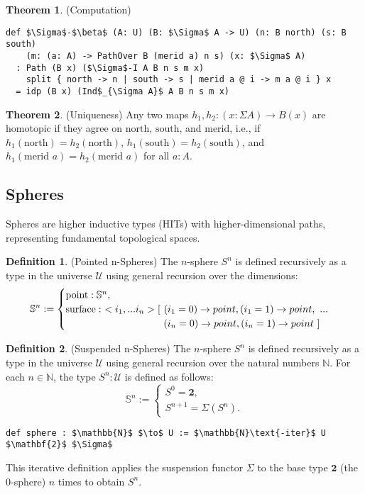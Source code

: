 \documentclass{article}
\theoremstyle{definition}
\newtheorem{theorem}{Theorem}
\newtheorem{definition}{Definition}
\begin{document}
\begin{theorem} (Computation)
\begin{lstlisting}[mathescape=true]
def $\Sigma$-$\beta$ (A: U) (B: $\Sigma$ A -> U) (n: B north) (s: B south)
    (m: (a: A) -> PathOver B (merid a) n s) (x: $\Sigma$ A)
  : Path (B x) ($\Sigma$-I A B n s m x)
    split { north -> n | south -> s | merid a @ i -> m a @ i } x
  = idp (B x) (Ind$_{\Sigma A}$ A B n s m x)
\end{lstlisting}
\end{theorem}

\begin{theorem} (Uniqueness)
Any two maps $h_1, h_2 : (x : \Sigma A) \to B(x)$ are homotopic if they agree
on $\text{north}$, $\text{south}$, and $\text{merid}$, i.e.,
if $h_1(\text{north}) = h_2(\text{north})$, $h_1(\text{south}) = h_2(\text{south})$,
and $h_1(\text{merid } a) = h_2(\text{merid } a)$ for all $a : A$.
\end{theorem}

\newpage
\subsection{Spheres}
Spheres are higher inductive types (HITs) with higher-dimensional
paths, representing fundamental topological spaces.

\begin{definition} (Pointed n-Spheres)
The $n$-sphere $S^n$ is defined recursively as a type in the
universe $\mathcal{U}$ using general recursion over the dimensions:
\[
\mathbb{S}^n :=
\begin{cases}
\text{point} : \mathbb{S}^n, \\
\text{surface} :\ <i_1,...i_n> [\ (i_1=0) \rightarrow point, (i_1=1) \rightarrow point,\ ... \\
\hspace{3.47cm} (i_n=0) \rightarrow point, (i_n=1) \rightarrow point\ ]
\end{cases}
\]
\end{definition}

\begin{definition} (Suspended n-Spheres)
The $n$-sphere $S^n$ is defined recursively as a type in the
universe $\mathcal{U}$ using general recursion over the natural
numbers $\mathbb{N}$. For each $n \in \mathbb{N}$,
the type $S^n : \mathcal{U}$ is defined as follows:
\[
\mathbb{S}^n :=
\begin{cases}
S^0 = \mathbf{2}, \\
S^{n+1} = \Sigma(S^n).
\end{cases}
\]
\begin{lstlisting}[mathescape=true]
def sphere : $\mathbb{N}$ $\to$ U := $\mathbb{N}\text{-iter}$ U $\mathbf{2}$ $\Sigma$
\end{lstlisting}
This iterative definition applies the suspension functor $\Sigma$
to the base type $\mathbf{2}$ (the 0-sphere) $n$ times to obtain $S^n$.
\end{definition}
\end{document}
